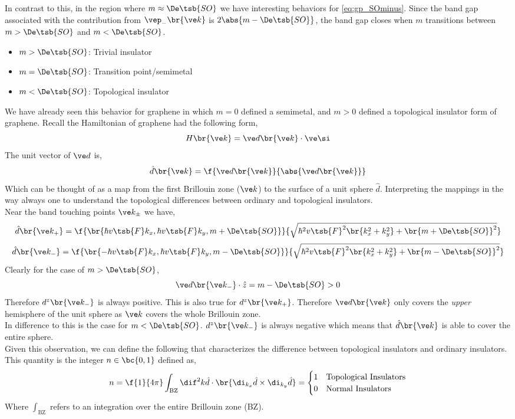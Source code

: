 \documentclass{article}
\begin{document}
In contrast to this, in the region where $m \approx \De\tsb{SO}$ we have interesting behaviors for \cref{eq:gp_SOminus}. Since the band gap associated with the contribution from $\vep_{-}\br{\ve k}$ is $2 \abs{m - \De\tsb{SO}}$, the band gap closes when $m$ transitions between $m > \De\tsb{SO}$ and $m < \De\tsb{SO}$.
\begin{itemize}
    \item $m > \De\tsb{SO}$: Trivial insulator
    \item $m = \De\tsb{SO}$: Transition point/semimetal
    \item $m < \De\tsb{SO}$: Topological insulator
\end{itemize}
We have already seen this behavior for graphene in which $m=0$ defined a semimetal, and $m>0$ defined a topological insulator form of graphene. Recall the Hamiltonian of graphene had the following form,
\[ H\br{\ve k} = \ve d \br{\ve k} \cdot \ve \si \]
The unit vector of $\ve d$ is,
\[ \hat d \br{\ve k} = \f{\ve d \br{\ve k}}{\abs{\ve d \br{\ve k}}} \]
Which can be thought of as a map from the first Brillouin zone ($\ve k$) to the surface of a unit sphere $\hat d$. Interpreting the mappings in the way always one to understand the topological differences between ordinary and topological insulators. \\

Near the band touching points $\ve k_{\pm}$ we have,
\[ \hat d\br{\ve k_{+}} = \f{\br{\hbar v\tsb{F} k_x,\hbar v\tsb{F} k_y, m+\De\tsb{SO}}}{\sqrt{\hbar^2 v\tsb{F}^2 \br{k_x^2 + k_y^2 } + \br{m + \De\tsb{SO}}^2}} \]
\[ \hat d\br{\ve k_{-}} = \f{\br{-\hbar v\tsb{F} k_x,\hbar v\tsb{F} k_y, m-\De\tsb{SO}}}{\sqrt{\hbar^2 v\tsb{F}^2 \br{k_x^2 + k_y^2 } + \br{m - \De\tsb{SO}}^2}} \]
Clearly for the case of $m > \De\tsb{SO}$,
\[ \ve d\br{\ve k_{-}} \cdot \hat z = m - \De\tsb{SO} > 0 \]
Therefore $d^z\br{\ve k_{-}}$ is always positive. This is also true for $d^z\br{\ve k_{+}}$. Therefore $\ve d\br{\ve k}$ only covers the \textit{upper} hemisphere of the unit sphere as $\ve k$ covers the whole Brillouin zone.\\

In difference to this is the case for $m < \De\tsb{SO}$. $d^{z}\br{\ve k_{-}}$ is always negative which means that $\hat d\br{\ve k}$ is able to cover the entire sphere.\\

Given this observation, we can define the following  that characterizes the difference between topological insulators and ordinary insulators. This quantity is the integer $n \in \bc{0,1}$ defined as,
\[ n = \f{1}{4\pi} \int_{\text{BZ}} \dif^2 k \hat d\cdot \br{\di_{k_x} \hat d \times \di_{k_y} \hat d} = \begin{cases}
    1 & \text{Topological Insulators} \\
    0 & \text{Normal Insulators} \\
\end{cases} \]
Where $\int_{\text{BZ}}$ refers to an integration over the entire Brillouin zone (BZ). \\
\end{document}
